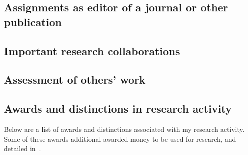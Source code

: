 \subsection{Assignments as editor of a journal or other publication \noneyet}\label{ssec:assignments-as-editor-of-a-journal-or-other-publication-noneyet}
\subsection{Important research collaborations}\label{ssec:important-research-collaborations}
\subsection{Assessment of others’ work \noneyet}\label{ssec:assessment-of-others-work-noneyet}
\subsection{Awards and distinctions in research activity}\label{ssec:awards-and-distinctions-in-research-activity}

Below are a list of awards and distinctions associated with my research activity. Some of these awards additional awarded money to be used for research, and detailed in~.

